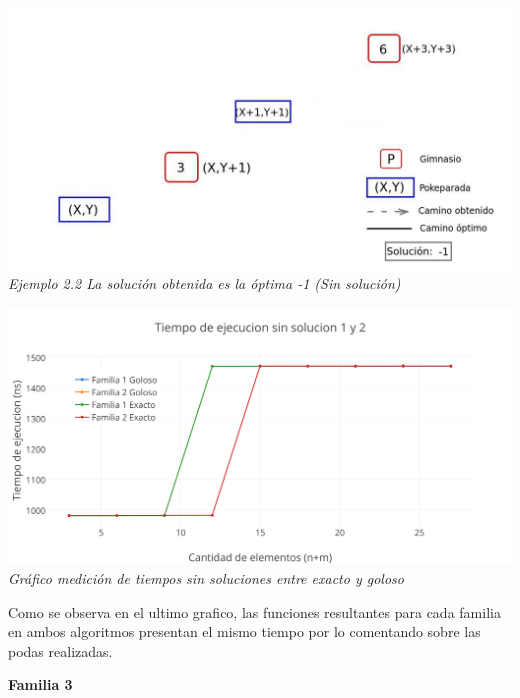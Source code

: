   \vspace*{0.3cm} \vspace*{0.3cm}
  \begin{center}
\includegraphics[scale=0.60]{./EJ2/sinSolucion1.jpeg}
\\{\textit{Ejemplo 2.2 La soluci\'on obtenida es la \'optima -1 (Sin soluci\'on)}}
  \end{center}
  \vspace*{0.3cm}


  \vspace*{0.3cm} \vspace*{0.3cm}
  \begin{center}
\includegraphics[scale=0.60]{./EJ2/mejorcaso.png}
\\{\textit{Gr\'afico medici\'on de tiempos sin soluciones entre exacto y goloso}}
  \end{center}
  \vspace*{0.3cm}

Como se observa en el ultimo grafico, las funciones resultantes para cada familia en ambos algoritmos presentan el mismo tiempo por lo comentando sobre las podas realizadas.\\

\begin{center}
\textbf{Familia 3}
\end{center}

